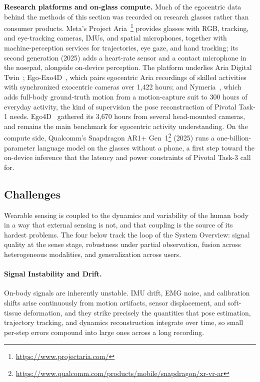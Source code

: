 \textbf{Research platforms and on-glass compute.} Much of the egocentric data behind the methods of this section was recorded on research glasses rather than consumer products. Meta's Project Aria~\cite{engel2023projectaria}\footnote{\url{https://www.projectaria.com/}} provides glasses with RGB, tracking, and eye-tracking cameras, IMUs, and spatial microphones, together with machine-perception services for trajectories, eye gaze, and hand tracking; its second generation (2025) adds a heart-rate sensor and a contact microphone in the nosepad, alongside on-device perception. The platform underlies Aria Digital Twin~\cite{adt}; Ego-Exo4D~\cite{grauman2024egoexo4d}, which pairs egocentric Aria recordings of skilled activities with synchronized exocentric cameras over 1{,}422 hours; and Nymeria~\cite{ma2024nymeria}, which adds full-body ground-truth motion from a motion-capture suit to 300 hours of everyday activity, the kind of supervision the pose reconstruction of Pivotal Task-1 needs. Ego4D~\cite{grauman2022ego4d} gathered its 3{,}670 hours from several head-mounted cameras, and remains the main benchmark for egocentric activity understanding. On the compute side, Qualcomm's Snapdragon AR1+ Gen~1\footnote{\url{https://www.qualcomm.com/products/mobile/snapdragon/xr-vr-ar}} (2025) runs a one-billion-parameter language model on the glasses without a phone, a first step toward the on-device inference that the latency and power constraints of Pivotal Task-3 call for.

\subsection{Challenges}
\label{subsec:p4-sec9-3-challenges}

Wearable sensing is coupled to the dynamics and variability of the human body in a way that external sensing is not, and that coupling is the source of its hardest problems. The four below track the loop of the System Overview: signal quality at the sense stage, robustness under partial observation, fusion across heterogeneous modalities, and generalization across users.

\paragraph{Signal Instability and Drift.}
On-body signals are inherently unstable. IMU drift, EMG noise, and calibration shifts arise continuously from motion artifacts, sensor displacement, and soft-tissue deformation, and they strike precisely the quantities that pose estimation, trajectory tracking, and dynamics reconstruction integrate over time, so small per-step errors compound into large ones across a long recording.


